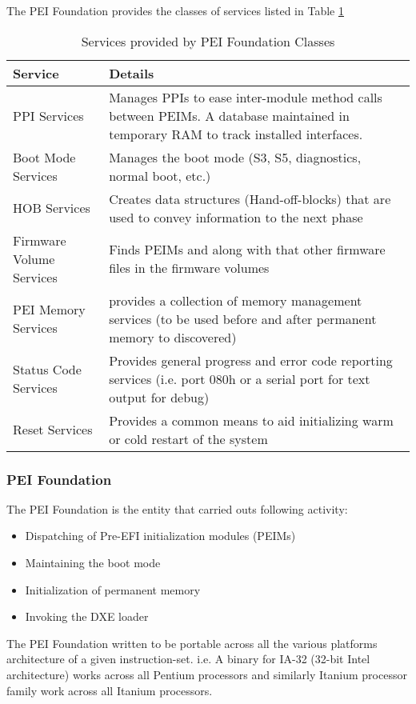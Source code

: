 The PEI Foundation provides the classes of services listed in Table \ref{table:design-pei-foundation-class-service}

\begin{table}[h]
	\centering
	\renewcommand*{\arraystretch}{2}
	\caption{Services provided by PEI Foundation Classes}\label{table:design-pei-foundation-class-service}
	\begin{tabular}{ l | p{9cm} }
		Service & Details
		\\ \hline \hline
		PPI Services & Manages PPIs to ease inter-module method calls between PEIMs. A database maintained in temporary RAM to track installed interfaces.
		\\ \hline
		Boot Mode Services & Manages the boot mode (S3, S5, diagnostics, normal boot, etc.)
		\\ \hline
		HOB Services & Creates data structures (Hand-off-blocks) that are used to convey information to the next phase 
		\\ \hline
		Firmware Volume Services & Finds PEIMs and along with that other firmware files in the firmware volumes
		\\ \hline
		PEI Memory Services & provides a collection of memory management services (to be used before and after permanent memory to discovered)
		\\ \hline
		Status Code Services & Provides general progress and error code reporting services (i.e. port 080h or a serial port for text output for debug)
		\\ \hline
		Reset Services & Provides a common means to aid initializing warm or cold restart of the system
		\\ \hline
	\end{tabular}

\end{table}


\subsubsection{PEI Foundation}
The PEI Foundation is the entity that carried outs following activity:
\begin{itemize}
	\item Dispatching of Pre-EFI initialization modules (PEIMs)
	\item Maintaining the boot mode
	\item Initialization of permanent memory
	\item Invoking the DXE loader 
\end{itemize}
The PEI Foundation written to be portable across all the various platforms architecture of a given instruction-set. i.e. A binary for IA-32 (32-bit Intel architecture) works across all Pentium processors and similarly Itanium processor family work across all Itanium processors.

